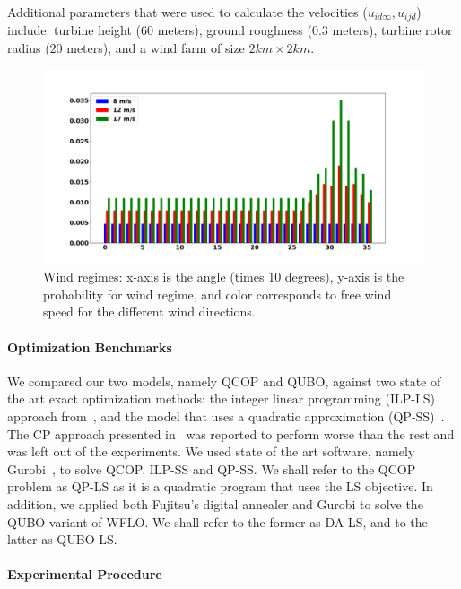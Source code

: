 \documentclass[preprint,12pt]{elsarticle}
\begin{document}
Additional parameters that were used to calculate 
the velocities ($u_{id\infty}, u_{ijd}$) include: turbine height ($60$ meters),
ground roughness ($0.3$ meters), turbine rotor radius ($20$ meters), and a wind farm of size $2km \times 2km$.


\begin{figure}[t]
	\centering
	\includegraphics[scale = 0.3]{prob_wind_pdf.pdf}
	
	\caption{Wind regimes: x-axis is the angle (times 10 degrees), y-axis is the probability for wind regime, and color corresponds to free wind speed for the different wind directions.}\label{fig:prob_wind}
\end{figure}

\paragraph{Optimization Benchmarks}

We compared our two models, namely QCOP and QUBO, against two state of the art exact optimization methods:
the integer linear programming (ILP-LS) approach from~\cite{donovan2005wind}, and the 
model that uses a quadratic approximation (QP-SS)~\cite{turner2014new}. The CP approach presented in~\cite{Zhang2014} was
reported to perform worse than the rest and was left out of the experiments.
We used state of the art software, namely Gurobi~\cite{gurobi}, to solve QCOP, ILP-SS and QP-SS. 
We shall refer to the QCOP problem as QP-LS as it is a quadratic program that uses the LS objective.
In addition, we 
applied both Fujitsu's digital annealer and Gurobi to solve the QUBO variant of WFLO. We shall refer to the former as DA-LS, and to the latter
as QUBO-LS.


\paragraph{Experimental Procedure}
\end{document}
